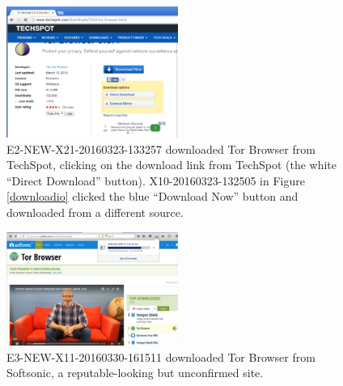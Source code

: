 \documentclass[USenglish,oneside,twocolumn]{article}
\begin{document}
\begin{figure}[h]
\label{techspot}
\includegraphics[width=0.5\textwidth]{../experiment/processing/bad-participants/20160323-133257-techspot.png}
\caption{E2-NEW-X21-20160323-133257 downloaded Tor Browser from TechSpot, clicking on the download link from 
TechSpot (the white ``Direct Download'' button). X10-20160323-132505 in Figure \ref{downloadio} clicked the blue ``Download Now'' button and downloaded from a different source.}
\end{figure}

\begin{figure}[h]
\label{softsonic}
\includegraphics[width=0.5\textwidth]{../experiment/processing/bad-participants/20160330-161511-softsonic.png}
\caption{E3-NEW-X11-20160330-161511 downloaded Tor Browser from Softsonic, a reputable-looking but
unconfirmed site.}
\end{figure}
\end{document}
